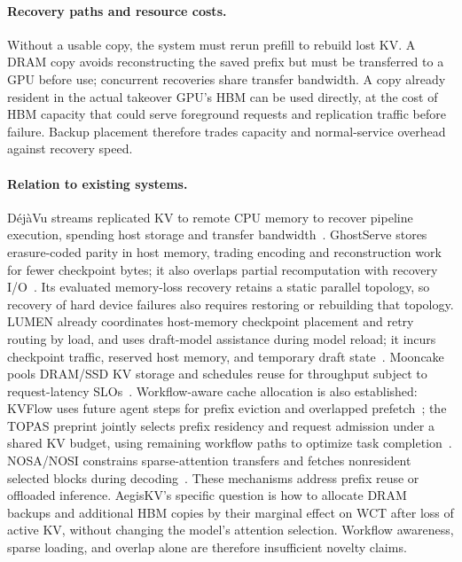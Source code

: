 \paragraph{Recovery paths and resource costs.}
Without a usable copy, the system must rerun prefill to rebuild lost KV.
A DRAM copy avoids reconstructing the saved prefix but must be transferred
to a GPU before use; concurrent recoveries share transfer bandwidth.
A copy already resident in the actual takeover GPU's HBM can be used
directly, at the cost of HBM capacity that could serve foreground requests
and replication traffic before failure. Backup placement therefore trades
capacity and normal-service overhead against recovery speed.

\paragraph{Relation to existing systems.}
D\'{e}j\`{a}Vu streams replicated KV to remote CPU memory to recover
pipeline execution, spending host storage and transfer
bandwidth~\cite{strati2024dejavu}. GhostServe stores erasure-coded parity
in host memory, trading encoding and reconstruction work for fewer
checkpoint bytes; it also overlaps partial recomputation with recovery
I/O~\cite{jayakody2026ghostserve}. Its evaluated memory-loss recovery
retains a static parallel topology, so recovery of hard device failures
also requires restoring or rebuilding that topology.
LUMEN already coordinates host-memory checkpoint placement and retry
routing by load, and uses draft-model assistance during model reload;
it incurs checkpoint traffic, reserved host memory, and temporary draft
state~\cite{cao2026lumen}. Mooncake pools DRAM/SSD KV storage and schedules
reuse for throughput subject to request-latency SLOs~\cite{qin2025mooncake}.
Workflow-aware cache allocation is also established: KVFlow uses future
agent steps for prefix eviction and overlapped
prefetch~\cite{pan2025kvflow}; the TOPAS preprint jointly selects prefix
residency and request admission under a shared KV budget, using remaining
workflow paths to optimize task completion~\cite{ni2026topas}.
NOSA/NOSI constrains sparse-attention transfers and fetches nonresident
selected blocks during decoding~\cite{huang2026nosav2}.
These mechanisms address prefix reuse or offloaded inference. AegisKV's
specific question is how to allocate DRAM backups and additional HBM
copies by their marginal effect on WCT after loss of active KV, without
changing the model's attention selection. Workflow awareness, sparse
loading, and overlap alone are therefore insufficient novelty claims.

